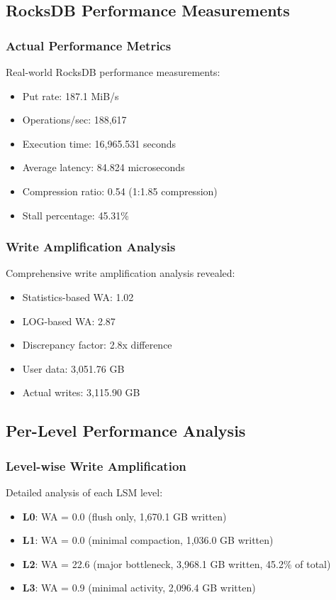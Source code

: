 \documentclass[11pt]{article}
\begin{document}
\subsection{RocksDB Performance Measurements}

\subsubsection{Actual Performance Metrics}
Real-world RocksDB performance measurements:
\begin{itemize}
    \item Put rate: 187.1 MiB/s
    \item Operations/sec: 188,617
    \item Execution time: 16,965.531 seconds
    \item Average latency: 84.824 microseconds
    \item Compression ratio: 0.54 (1:1.85 compression)
    \item Stall percentage: 45.31\%
\end{itemize}

\subsubsection{Write Amplification Analysis}
Comprehensive write amplification analysis revealed:
\begin{itemize}
    \item Statistics-based WA: 1.02
    \item LOG-based WA: 2.87
    \item Discrepancy factor: 2.8x difference
    \item User data: 3,051.76 GB
    \item Actual writes: 3,115.90 GB
\end{itemize}

\subsection{Per-Level Performance Analysis}

\subsubsection{Level-wise Write Amplification}
Detailed analysis of each LSM level:
\begin{itemize}
    \item \textbf{L0}: WA = 0.0 (flush only, 1,670.1 GB written)
    \item \textbf{L1}: WA = 0.0 (minimal compaction, 1,036.0 GB written)
    \item \textbf{L2}: WA = 22.6 (major bottleneck, 3,968.1 GB written, 45.2\% of total)
    \item \textbf{L3}: WA = 0.9 (minimal activity, 2,096.4 GB written)
\end{itemize}
\end{document}
